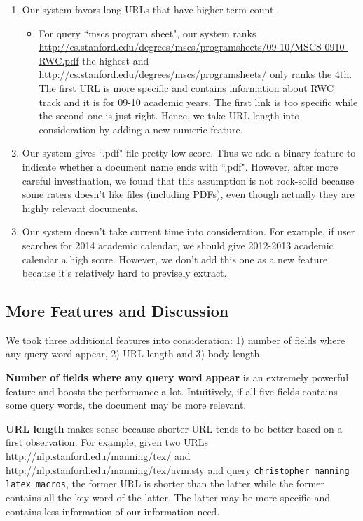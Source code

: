 \documentclass{article}
\begin{document}
\begin{enumerate}
  \item Our system favors long URLs that have higher term count.
    \begin{itemize}
      \item For query ``mscs program sheet", our system ranks \url{http://cs.stanford.edu/degrees/mscs/programsheets/09-10/MSCS-0910-RWC.pdf} the highest and \url{http://cs.stanford.edu/degrees/mscs/programsheets/} only ranks the 4th. The first URL is more specific and contains information about RWC track and it is for 09-10 academic years. The first link is too specific while the second one is just right. Hence, we take URL length into consideration by adding a new numeric feature.
    \end{itemize}
\item Our system gives ``.pdf" file pretty low score. Thus we add a binary feature to indicate whether a document name ends with ``.pdf". However, after more careful investination, we found that this assumption is not rock-solid because some raters doesn't like files (including PDFs), even though actually they are highly relevant documents.
  \item Our system doesn't take current time into consideration. For example, if user searches for 2014 academic calendar, we should give 2012-2013 academic calendar a high score. However, we don't add this one as a new feature because it's relatively hard to previsely extract.
\end{enumerate}

\subsection{More Features and Discussion}

We took three additional features into consideration: 1) number of fields where any query word appear, 2) URL length and 3) body length.

\textbf{Number of fields where any query word appear} is an extremely powerful feature and boosts the performance a lot. Intuitively, if all five fields contains some query words, the document may be more relevant.

\textbf{URL length} makes sense because shorter URL tends to be better based on a first observation. For example, given two URLs \url{http://nlp.stanford.edu/manning/tex/} and \url{http://nlp.stanford.edu/manning/tex/avm.sty} and query \texttt{christopher manning latex macros}, the former URL is shorter than the latter while the former contains all the key word of the latter. The latter may be more specific and contains less information of our information need.
\end{document}
